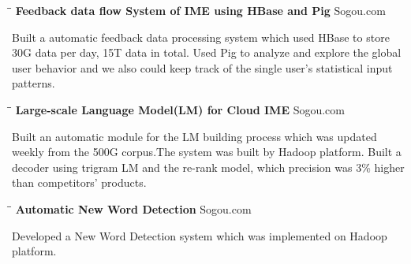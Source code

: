 \documentclass{res}
\begin{document}
\begin{resume}
   \begin{tabbing}
   \hspace{2in}\= \hspace{3in}\= \kill %
    {\bf Feedback data flow System of IME using HBase and Pig}\> \>Sogou.com     \\
   \end{tabbing}\vspace{-30pt}      %
   Built a automatic feedback data processing system which used HBase to store 30G data per day, 15T data in total. Used Pig to analyze and explore the global user behavior and we also could keep track of the single user's statistical input patterns. 
   \vspace{-0.1in}	
   \begin{tabbing}
   \hspace{2in}\= \hspace{3in}\= \kill %
    {\bf Large-scale Language Model(LM) for Cloud IME} \> \>Sogou.com     \\
   \end{tabbing}\vspace{-30pt}      %
   Built an automatic module for the LM building process which was updated weekly from the 500G corpus.The system was built by Hadoop platform. Built a decoder using trigram LM and the re-rank model, which precision was 3\% higher than competitors' products.
   \vspace{-0.1in}	
   \begin{tabbing}
   \hspace{2in}\= \hspace{3in}\= \kill %
    {\bf Automatic New Word Detection}\> \>Sogou.com     \\
   \end{tabbing}\vspace{-30pt}      %
   Developed a New Word Detection system which was implemented on Hadoop platform.\\
   \vspace{-0.1in}	
   \begin{tabbing}

\end{tabbing}
\end{resume}
\end{document}
